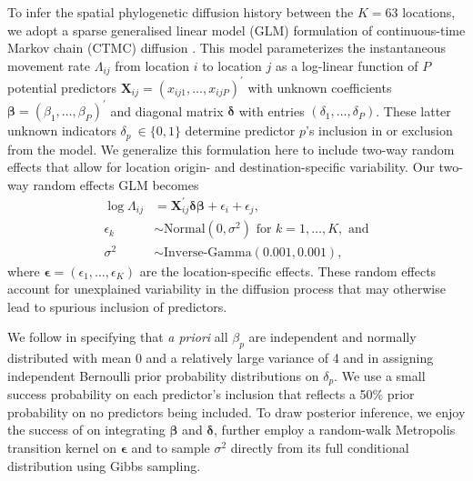 \documentclass[11pt,oneside,letterpaper]{article}
\newcommand{\rateMatrixElement}{\ensuremath{\Lambda_{ij}}}
\newcommand{\coefficient}{\ensuremath{\beta}}
\newcommand{\coefficientSpace}{\ensuremath{\beta} }
\newcommand{\indicator}{\ensuremath{\delta}}
\newcommand{\idxPredictor}{p}
\newcommand{\transpose}{^{'}}
\newcommand{\numPredictors}{P}
\newcommand{\numLocations}{K}
\newcommand{\incIndicator}{\delta}
\begin{document}
To infer the spatial phylogenetic diffusion history between the $\numLocations = 63$ locations, we adopt a sparse generalised linear model (GLM) formulation of continuous-time Markov chain (CTMC) diffusion \citep{lemey_2014}.
This model parameterizes the instantaneous movement rate $\rateMatrixElement$ from location $i$ to location $j$ as a log-linear function of $\numPredictors$ potential predictors $\mathbf{X}_{ij} = \left( x_{ij1} , \ldots, x_{ij \numPredictors} \right)\transpose$ with unknown coefficients $\boldsymbol{\coefficient} = (\coefficient_1, \ldots, \coefficientSpace_{\numPredictors})\transpose$ and 
diagonal matrix $\boldsymbol{\incIndicator}$ with entries $\left( \incIndicator_1, \ldots, \incIndicator_{\numPredictors} \right)$.
These latter unknown indicators $\incIndicator_{\idxPredictor} \ \in \{0,1\}$ determine predictor $\idxPredictor$'s inclusion in or exclusion from the model.
We generalize this formulation here to include two-way random effects that allow for location origin- and destination-specific variability.  
Our two-way random effects GLM becomes
\begin{equation}
\begin{aligned}
\log \rateMatrixElement &= \mathbf{X}_{ij}\transpose \boldsymbol{\incIndicator} \boldsymbol{\beta}
+ \epsilon_i + \epsilon_j, \\
\epsilon_k &\sim \text{Normal}(0, \sigma^2) \text{ for } k = 1, \ldots, \numLocations, \text{ and} \\
\sigma^{2} &\sim \text{Inverse-Gamma}(0.001, 0.001),
\end{aligned}
\end{equation}
where 
$\boldsymbol{\epsilon} = \left( \epsilon_{1}, \ldots, \epsilon_{\numLocations} \right)$ are the location-specific effects.
These random effects account for unexplained variability in the diffusion process that may otherwise lead to spurious inclusion of predictors.

We follow \cite{lemey_2014} in specifying that \textit{a priori} all $\coefficient_{\idxPredictor}$ are independent and normally distributed with mean 0 and a relatively large variance of 4 and in assigning independent Bernoulli prior probability distributions on $\indicator_{\idxPredictor}$.
We use a small success probability on each predictor's inclusion that reflects a 50\% prior probability on no predictors being included. 
To draw posterior inference, we enjoy the success of \cite{lemey_2014} on integrating $\boldsymbol{\beta}$ and $\boldsymbol{\incIndicator}$, further employ a random-walk Metropolis transition kernel on $\boldsymbol{\epsilon}$ and to sample $\sigma^2$ directly from its full conditional distribution using Gibbs sampling.
\end{document}
